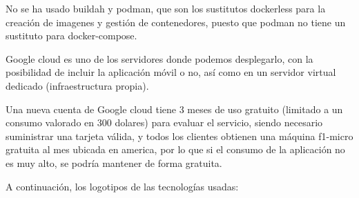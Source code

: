 \documentclass[11pt,spanish,listoffigures,listoftables]{tfgetsinf}
\begin{document}
No se ha usado buildah y podman, que son los sustitutos dockerless para la creación de imagenes y gestión de contenedores, puesto que podman no tiene un sustituto para docker-compose.

Google cloud es uno de los servidores donde podemos desplegarlo, con la posibilidad de incluir la aplicación móvil o no, así como en un servidor virtual dedicado (infraestructura propia). 

Una nueva cuenta de Google cloud tiene 3 meses de uso gratuito (limitado a un consumo valorado en 300 dolares) para evaluar el servicio, siendo necesario suministrar una tarjeta válida, y todos los clientes obtienen una máquina f1-micro gratuita al mes ubicada en america, por lo que si el consumo de la aplicación no es muy alto, se podría mantener de forma gratuita.

A continuación, los logotipos de las tecnologías usadas:
\end{document}
